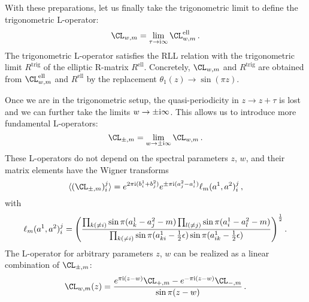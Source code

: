 With these preparations, let us finally take the trigonometric limit
to define the trigonometric L-operator:
\begin{equation}
  \CL_{w,m}
  = \lim_{\tau \to \iu\infty} \CL^{\text{ell}}_{w,m} \,.
\end{equation}
The trigonometric L-operator satisfies the RLL relation with the
trigonometric limit $R^{\text{trig}}$ of the elliptic R-matrix
$R^{\text{ell}}$.  Concretely, $\CL_{w,m}$ and $R^{\text{trig}}$ are
obtained from $\CL^{\text{ell}}_{w,m}$ and $R^{\text{ell}}$ by the
replacement $\theta_1(z) \to \sin(\pi z)$.

Once we are in the trigonometric setup, the quasi-periodicity in
$z \to z + \tau$ is lost and we can further take the limits
$w \to \pm\mathrm{i}\infty$.  This allows us to introduce more fundamental
L-operators:
\begin{equation}
  \label{eq:fund-L}
  \CL_{\pm,m} = \lim_{w \to \pm\iu\infty} \CL_{w,m} \,.
\end{equation}
These L-operators do not depend on the spectral parameters $z$, $w$,
and their matrix elements have the Wigner transforms
\begin{equation}
  \label{eq:fund-L-ij}
  \vev{(\CL_{\pm,m})_i^j}
  =
  e^{2\pi\iu(b_i^1 + b_j^2)}
  e^{\pm\pi\iu(a^2_j - a^1_i)}
  \ell_m(a^1, a^2)_i^j \,,
\end{equation}
with
\begin{equation}
  \label{eq:ell}
  \ell_m(a^1, a^2)_i^j
  =
  \Biggl(
  \frac{\prod_{k (\neq i)} \sin\pi(a^1_k - a^2_j - m)
        \prod_{l (\neq j)} \sin\pi(a^1_i - a^2_l - m)}
        {\prod_{k (\neq i)}\sin\pi(a^1_{ki} - \frac12\epsilon)
        \sin\pi(a^1_{ik} - \frac12\epsilon)}
  \Biggr)^{\frac12}
  \,.
\end{equation}
The L-operator for arbitrary parameters $z$, $w$ can be realized as a
linear combination of $\CL_{\pm,m}$:
\begin{equation}
  \CL_{w,m}(z)
  =
  \frac{e^{\pi\iu(z-w)} \CL_{+,m} - e^{-\pi\iu(z-w)} \CL_{-,m}}{\sin\pi(z-w)}
  \,.
\end{equation}

